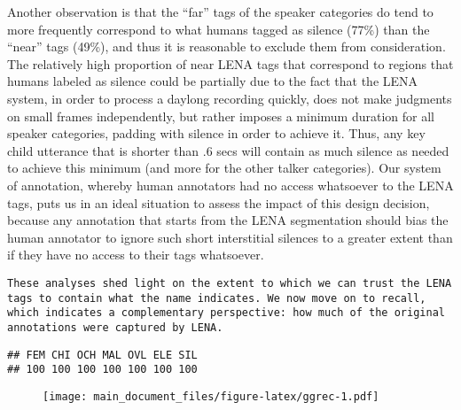 \documentclass[english,floatsintext,man]{apa6}
\begin{document}
Another observation is that the \enquote{far} tags of the speaker
categories do tend to more frequently correspond to what humans tagged
as silence (77\%) than the \enquote{near} tags (49\%), and thus it is
reasonable to exclude them from consideration. The relatively high
proportion of near LENA tags that correspond to regions that humans
labeled as silence could be partially due to the fact that the LENA
system, in order to process a daylong recording quickly, does not make
judgments on small frames independently, but rather imposes a minimum
duration for all speaker categories, padding with silence in order to
achieve it. Thus, any key child utterance that is shorter than .6 secs
will contain as much silence as needed to achieve this minimum (and more
for the other talker categories). Our system of annotation, whereby
human annotators had no access whatsoever to the LENA tags, puts us in
an ideal situation to assess the impact of this design decision, because
any annotation that starts from the LENA segmentation should bias the
human annotator to ignore such short interstitial silences to a greater
extent than if they have no access to their tags whatsoever.

\begin{verbatim}
These analyses shed light on the extent to which we can trust the LENA tags to contain what the name indicates. We now move on to recall, which indicates a complementary perspective: how much of the original annotations were captured by LENA.
\end{verbatim}

\begin{verbatim}
## FEM CHI OCH MAL OVL ELE SIL 
## 100 100 100 100 100 100 100
\end{verbatim}

\begin{figure}
\centering
\texttt{[image: main\_document\_files/figure-latex/ggrec-1.pdf]}
\caption{}
\end{figure}
\end{document}

